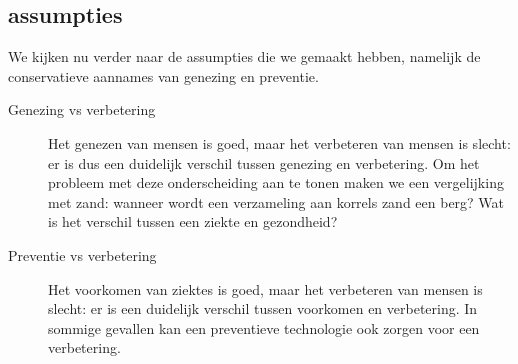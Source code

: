 \documentclass[../summary.tex]{subfiles}
\begin{document}
		\subsection{assumpties}
			We kijken nu verder naar de assumpties die we gemaakt hebben, namelijk de conservatieve aannames van genezing en preventie. 
			\begin{description}
				\item[Genezing vs verbetering] Het genezen van mensen is goed, maar het verbeteren van mensen is slecht: er is dus een duidelijk verschil tussen genezing en verbetering. Om het probleem met deze onderscheiding aan te tonen maken we een vergelijking met zand: wanneer wordt een verzameling aan korrels zand een berg? Wat is het verschil tussen een ziekte en gezondheid?
				\item[Preventie vs verbetering] Het voorkomen van ziektes is goed, maar het verbeteren van mensen is slecht: er is een duidelijk verschil tussen voorkomen en verbetering. In sommige gevallen kan een preventieve technologie ook zorgen voor een verbetering. 
			\end{description}
\end{document}
